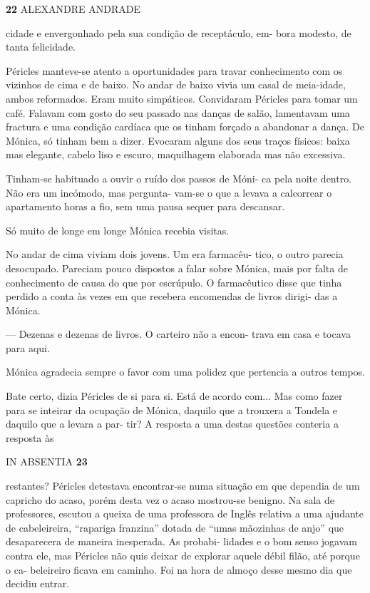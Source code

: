 \textbf{22 }ALEXANDRE ANDRADE

cidade e envergonhado pela sua condição de receptáculo, em- bora
modesto, de tanta felicidade.

Péricles manteve-se atento a oportunidades para travar conhecimento com
os vizinhos de cima e de baixo. No andar de baixo vivia um casal de
meia-idade, ambos reformados. Eram muito simpáticos. Convidaram Péricles
para tomar um café. Falavam com gosto do seu passado nas danças de
salão, lamentavam uma fractura e uma condição cardíaca que os tinham
forçado a abandonar a dança. De Mónica, só tinham bem a dizer. Evocaram
alguns dos seus traços físicos: baixa mas elegante, cabelo liso e
escuro, maquilhagem elaborada mas não excessiva.

Tinham-se habituado a ouvir o ruído dos passos de Móni- ca pela noite
dentro. Não era um incómodo, mas pergunta- vam-se o que a levava a
calcorrear o apartamento horas a fio, sem uma pausa sequer para
descansar.

Só muito de longe em longe Mónica recebia visitas.

No andar de cima viviam dois jovens. Um era farmacêu- tico, o outro
parecia desocupado. Pareciam pouco dispostos a falar sobre Mónica, mais
por falta de conhecimento de causa do que por escrúpulo. O farmacêutico
disse que tinha perdido a conta às vezes em que recebera encomendas de
livros dirigi- das a Mónica.

--- Dezenas e dezenas de livros. O carteiro não a encon- trava em casa e
tocava para aqui.

Mónica agradecia sempre o favor com uma polidez que pertencia a outros
tempos.

Bate certo, dizia Péricles de si para si. Está de acordo com... Mas como
fazer para se inteirar da ocupação de Mónica, daquilo que a trouxera a
Tondela e daquilo que a levara a par- tir? A resposta a uma destas
questões conteria a resposta às

IN ABSENTIA \textbf{23}

restantes? Péricles detestava encontrar-se numa situação em que dependia
de um capricho do acaso, porém desta vez o acaso mostrou-se benigno. Na
sala de professores, escutou a queixa de uma professora de Inglês
relativa a uma ajudante de cabeleireira, ``rapariga franzina'' dotada de
``umas mãozinhas de anjo'' que desaparecera de maneira inesperada. As
probabi- lidades e o bom senso jogavam contra ele, mas Péricles não quis
deixar de explorar aquele débil filão, até porque o ca- beleireiro
ficava em caminho. Foi na hora de almoço desse mesmo dia que decidiu
entrar.


